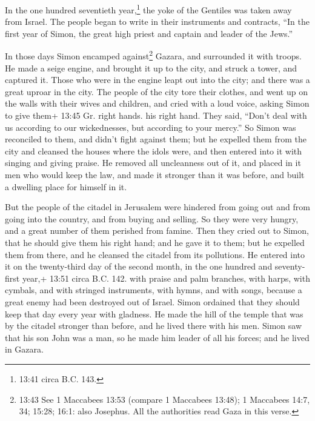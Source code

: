  In the one hundred seventieth year,\footnote{13:41 circa
  B.C. 143.} the yoke of the Gentiles was taken away from Israel.
 The people began to write in their instruments and
contracts, ``In the first year of Simon, the great high priest and
captain and leader of the Jews.''

 In those days Simon encamped against\footnote{13:43 See 1
  Maccabees 13:53 (compare 1 Maccabees 13:48); 1 Maccabees 14:7, 34;
  15:28; 16:1: also Josephus. All the authorities read Gaza in this
  verse.} Gazara, and surrounded it with troops. He made a seige engine,
and brought it up to the city, and struck a tower, and captured it.
 Those who were in the engine leapt out into the city; and
there was a great uproar in the city.  The people of the
city tore their clothes, and went up on the walls with their wives and
children, and cried with a loud voice, asking Simon to give them+ 13:45
Gr. right hands. his right hand.  They said, ``Don't deal
with us according to our wickednesses, but according to your mercy.''
 So Simon was reconciled to them, and didn't fight against
them; but he expelled them from the city and cleansed the houses where
the idols were, and then entered into it with singing and giving praise.
 He removed all uncleanness out of it, and placed in it men
who would keep the law, and made it stronger than it was before, and
built a dwelling place for himself in it.

 But the people of the citadel in Jerusalem were hindered
from going out and from going into the country, and from buying and
selling. So they were very hungry, and a great number of them perished
from famine.  Then they cried out to Simon, that he should
give them his right hand; and he gave it to them; but he expelled them
from there, and he cleansed the citadel from its pollutions.
 He entered into it on the twenty-third day of the second
month, in the one hundred and seventy-first year,+ 13:51 circa B.C. 142.
with praise and palm branches, with harps, with cymbals, and with
stringed instruments, with hymns, and with songs, because a great enemy
had been destroyed out of Israel.  Simon ordained that they
should keep that day every year with gladness. He made the hill of the
temple that was by the citadel stronger than before, and he lived there
with his men.  Simon saw that his son John was a man, so he
made him leader of all his forces; and he lived in Gazara.

